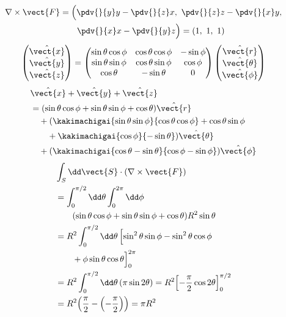 \begin{align*}
\nabla\times\vect{F}&=\Bigl(\pdv{}{y}y-\pdv{}{z}x,\ \pdv{}{z}z-\pdv{}{x}y,\\
&\qquad\pdv{}{x}x-\pdv{}{y}z\Bigr)=(1,\ 1,\ 1)
\end{align*}
\[ \begin{pmatrix}\hat{\vect{x}}\\\hat{\vect{y}}\\\hat{\vect{z}}\end{pmatrix}=\begin{pmatrix}\sin\theta\cos\phi&\cos\theta\cos\phi&-\sin\phi\\\sin\theta\sin\phi&\cos\theta\sin\phi&\cos\phi\\\cos\theta&-\sin\theta&0\end{pmatrix}\begin{pmatrix}\hat{\vect{r}}\\\hat{\vect{\theta}}\\\hat{\vect{\phi}}\end{pmatrix} \]
\begin{align*}
&\hat{\vect{x}}+\hat{\vect{y}}+\hat{\vect{z}}\\
&=(\sin\theta\cos\phi+\sin\theta\sin\phi+\cos\theta)\hat{\vect{r}}\\
&\quad+(\kakimachigai{\sin\theta\sin\phi}{\cos\theta\cos\phi}+\cos\theta\sin\phi\\
&\qquad+\kakimachigai{\cos\phi}{-\sin\theta})\hat{\vect{\theta}}\\
&\quad+(\kakimachigai{\cos\theta-\sin\theta}{\cos\phi-\sin\phi})\hat{\vect{\phi}}
\end{align*}
\begin{align*}
&\int_{S}\dd\vect{S}\cdot(\nabla\times\vect{F})\\
&=\int_{0}^{\pi/2}\dd\theta\int_{0}^{2\pi}\dd\phi\\
&\qquad(\sin\theta\cos\phi+\sin\theta\sin\phi+\cos\theta)R^{2}\sin\theta\\
&=R^{2}\int_{0}^{\pi/2}\dd\theta\,\Bigl[\sin^{2}\theta\sin\phi-\sin^{2}\theta\cos\phi\\
&\qquad+\phi\sin\theta\cos\theta\Bigr]_{0}^{2\pi}\\
&=R^{2}\int_{0}^{\pi/2}\dd\theta\,(\pi\sin2\theta)=R^{2}\Bigl[-\frac{\pi}{2}\cos2\theta\Bigr]_{0}^{\pi/2}\\
&=R^{2}\Bigl(\frac{\pi}{2}-\Bigl(-\frac{\pi}{2}\Bigr)\Bigr)=\pi R^{2}
\end{align*}
